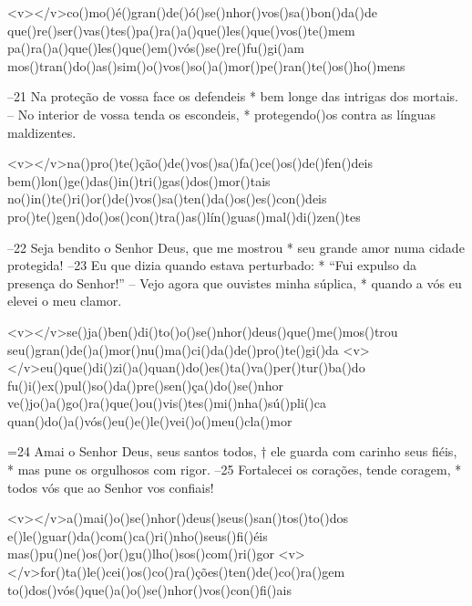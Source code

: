 <v></v>co()mo()é()gran()de()ó()se()nhor()vos()sa()bon()da()de
que()re()ser()vas()tes()pa()ra()a()que()les()que()vos()te()mem
pa()ra()a()que()les()que()em()vós()se()re()fu()gi()am
mos()tran()do()as()sim()o()vos()so()a()mor()pe()ran()te()os()ho()mens

–21 Na proteção de vossa face os defendeis *
bem longe das intrigas dos mortais.
– No interior de vossa tenda os escondeis, *
protegendo()os contra as línguas maldizentes.

<v></v>na()pro()te()ção()de()vos()sa()fa()ce()os()de()fen()deis
bem()lon()ge()das()in()tri()gas()dos()mor()tais
no()in()te()ri()or()de()vos()sa()ten()da()os()es()con()deis
pro()te()gen()do()os()con()tra()as()lín()guas()mal()di()zen()tes

–22 Seja bendito o Senhor Deus, que me mostrou *
seu grande amor numa cidade protegida!
–23 Eu que dizia quando estava perturbado: *
“Fui expulso da presença do Senhor!”
– Vejo agora que ouvistes minha súplica, *
quando a vós eu elevei o meu clamor.

<v></v>se()ja()ben()di()to()o()se()nhor()deus()que()me()mos()trou
seu()gran()de()a()mor()nu()ma()ci()da()de()pro()te()gi()da
<v></v>eu()que()di()zi()a()quan()do()es()ta()va()per()tur()ba()do
fu()i()ex()pul()so()da()pre()sen()ça()do()se()nhor
ve()jo()a()go()ra()que()ou()vis()tes()mi()nha()sú()pli()ca
quan()do()a()vós()eu()e()le()vei()o()meu()cla()mor

=24 Amai o Senhor Deus, seus santos todos, †
ele guarda com carinho seus fiéis, *
mas pune os orgulhosos com rigor.
–25 Fortalecei os corações, tende coragem, *
todos vós que ao Senhor vos confiais!

<v>\VSup{}</v>a()mai()o()se()nhor()deus()seus()san()tos()to()dos
e()le()guar()da()com()ca()ri()nho()seus()fi()éis
mas()pu()ne()os()or()gu()lho()sos()com()ri()gor
<v>\VSup{}</v>for()ta()le()cei()os()co()ra()ções()ten()de()co()ra()gem
to()dos()vós()que()a()o()se()nhor()vos()con()fi()ais